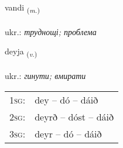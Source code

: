 \documentclass[frontgrid, backgrid]{flacards}\usepackage[]{graphicx}\usepackage[]{xcolor}
\begin{document}
\renewcommand{\flhead}{\vskip5pt \fboxsep=0pt {\small\bfseries\footnotesize Nafnorð | іменник}}
\renewcommand{\fcfoot}{\vskip5pt \fboxsep=0pt \hspace{2pt}{\small\bfseries\footnotesize 1K}}

\renewcommand{\blhead}{\vskip5pt {\small\bfseries\footnotesize Nafnorð | іменник }}
\renewcommand{\bcfoot}{\vskip5pt \hspace{2pt}{\small\bfseries\footnotesize 1K}}


{vandi \small{\textsubscript{(\textit{m.})}} \\[1ex] %
\textphonetic{[vantɪ]} \\
ukr.: \emph{труднощі; проблема} \\  [2ex]
\renewcommand*{\arraystretch}{0.8}
}

\renewcommand{\flhead}{\vskip5pt \fboxsep=0pt {\small\bfseries\footnotesize Sagnorð | дієслово}}
\renewcommand{\fcfoot}{\vskip5pt \fboxsep=0pt \hspace{2pt}{\small\bfseries\footnotesize 1K}}

\renewcommand{\blhead}{\vskip5pt {\small\bfseries\footnotesize Sagnorð | дієслово }}
\renewcommand{\bcfoot}{\vskip5pt \hspace{2pt}{\small\bfseries\footnotesize 1K}}


{deyja \small{\textsubscript{(\textit{v.})}} \\[1ex] %
\textphonetic{[teiːja]} \\
ukr.: \emph{гинути; вмирати} \\  [2ex]
\renewcommand*{\arraystretch}{0.8}
\begin{tabular}{p{1cm}l}
\textsc{1sg}: & dey -- dó -- dáið \\ 
\textsc{2sg}: & deyrð -- dóst -- dáið \\ 
\textsc{3sg}: & deyr -- dó -- dáið \\ 
\end{tabular}
}
\end{document}
